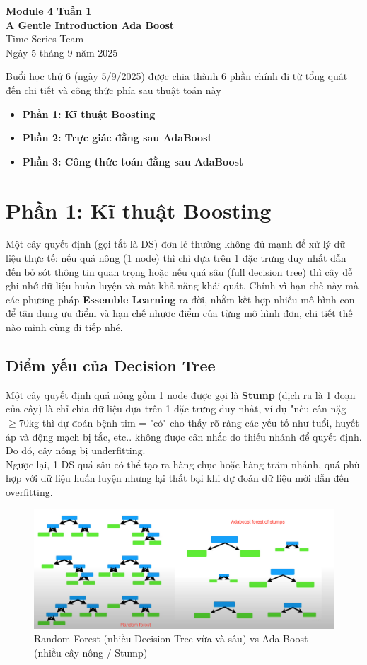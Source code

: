 \documentclass[11pt]{article}
\renewcommand{\maketitle}{%
    \begin{center}
        \fontsize{18}{20}\selectfont\textbf{Module 4 Tuần 1 \\[0.2em] A Gentle Introduction Ada Boost}\\[1em]
        \fontsize{14}{16}\selectfont Time-Series Team\\[0.5em]
        \fontsize{14}{16}\selectfont Ngày 5 tháng 9 năm 2025
    \end{center}
    \vspace{1.5em}
}
\begin{document}
\maketitle

\begin{summarybox}
Buổi học thứ 6 (ngày 5/9/2025) được chia thành 6 phần chính đi từ tổng quát đến chi tiết và công thức phía sau thuật toán này
    \begin{itemize}
        \item \textbf{Phần 1: Kĩ thuật Boosting}
        \item \textbf{Phần 2: Trực giác đằng sau AdaBoost }
        \item \textbf{Phần 3: Công thức toán đằng sau AdaBoost}
    \end{itemize}
\end{summarybox}

\section{Phần 1: Kĩ thuật Boosting}
Một cây quyết định (gọi tắt là DS) đơn lẻ thường không đủ mạnh để xử lý dữ liệu thực tế: nếu quá nông (1 node) thì chỉ dựa trên 1 đặc trưng duy nhất dẫn đến bỏ sót thông tin quan trọng hoặc nếu quá sâu (full decision tree) thì cây dễ ghi nhớ dữ liệu huấn luyện và mất khả năng khái quát. Chính vì hạn chế này mà các phương pháp \textbf{Essemble Learning} ra đời, nhằm kết hợp nhiều mô hình con để tận dụng ưu điểm và hạn chế nhược điểm của từng mô hình đơn, chi tiết thế nào mình cùng đi tiếp nhé.

 \subsection{Điểm yếu của Decision Tree}
Một cây quyết định quá nông gồm 1 node được gọi là \textbf{Stump} (dịch ra là 1 đoạn của cây) là chỉ chia dữ liệu dựa trên 1 đặc trưng duy nhất, ví dụ "nếu cân nặg $\geq 70$kg thì dự đoán bệnh tim = "có" cho thấy rõ ràng các yếu tố như tuổi, huyết áp và động mạch bị tắc, etc.. không được cân nhắc do thiếu nhánh để quyết định. Do đó, cây nông bị underfitting. \\

Ngược lại, 1 DS quá sâu có thể tạo ra hàng chục hoặc hàng trăm nhánh, quá phù hợp với dữ liệu huấn luyện nhưng lại thất bại khi dự đoán dữ liệu mới dẫn đến overfitting. 

\begin{figure}[H]
    \centering
    \includegraphics[width=0.7\linewidth]{images/ds_ada.png}
    \caption{Random Forest (nhiều Decision Tree vừa và sâu) vs Ada Boost (nhiều cây nông / Stump)}
\end{figure}
 
\end{document}
